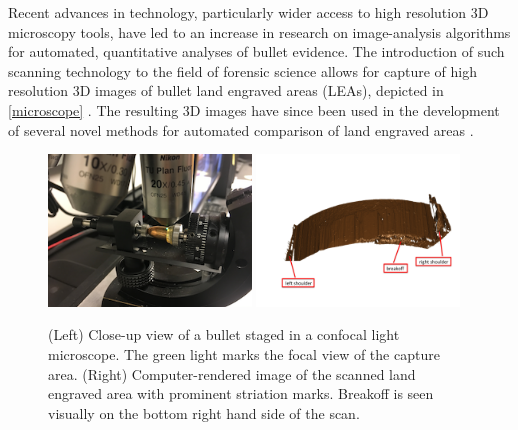 \documentclass[12pt]{article}
\begin{document}
Recent advances in technology, particularly wider access to high
resolution 3D microscopy tools, have led to an increase in research on
image-analysis algorithms for automated, quantitative analyses of bullet
evidence. The introduction of such scanning technology to the field of
forensic science allows for capture of high resolution 3D images of
bullet land engraved areas (LEAs), depicted in \autoref{microscope}
\citep[see][]{DeKinder1, DeKinder2, Bachrach1}. The resulting 3D images
have since been used in the development of several novel methods for
automated comparison of land engraved areas
\citep[e.g.][]{Ma1, Chu1, Chu2, Hare1}.

\begin{figure}

{\centering \includegraphics[width=0.48\textwidth]{./images/microscope-small} \includegraphics[width=0.48\textwidth]{./images/HS44-Br1-B1-L2-annotated} 

}

\caption{\label{microscope}(Left) Close-up view of a bullet staged in a confocal light microscope. The green light marks the focal view of the capture area. (Right) Computer-rendered image of the scanned land engraved area with prominent striation marks. Breakoff is seen visually on the bottom right hand side of the scan.}\label{fig:microscope}
\end{figure}
\end{document}
